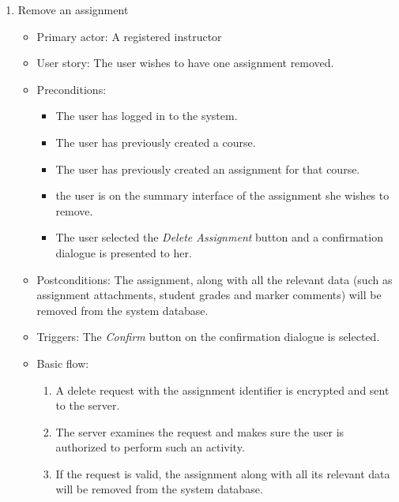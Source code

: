 \begin{enumerate}
\item Remove an assignment
\begin{itemize}
    \item Primary actor: A registered instructor
    \item User story: The user wishes to have one assignment removed.
    \item Preconditions:
        \begin{itemize}
            \item The user has logged in to the system.
            \item The user has previously created a course.
            \item The user has previously created an assignment for that course.
            \item the user is on the summary interface of the assignment she
                wishes to remove.
            \item The user selected the \emph{Delete Assignment} button and a
                confirmation dialogue is presented to her.
        \end{itemize}
    \item Postconditions:
        The assignment, along with all the relevant data (such as assignment
        attachments, student grades and marker comments) will be removed from
        the system database.
    \item Triggers: The \emph{Confirm} button on the confirmation dialogue is
        selected.
    \item Basic flow:
        \begin{enumerate}
            \item A delete request with the assignment identifier is encrypted
                and sent to the server.
            \item The server examines the request and makes sure the user is
                authorized to perform such an activity.
            \item If the request is valid, the assignment along with all its
                relevant data will be removed from the system database.
        \end{enumerate}
\end{itemize}


\end{enumerate}
